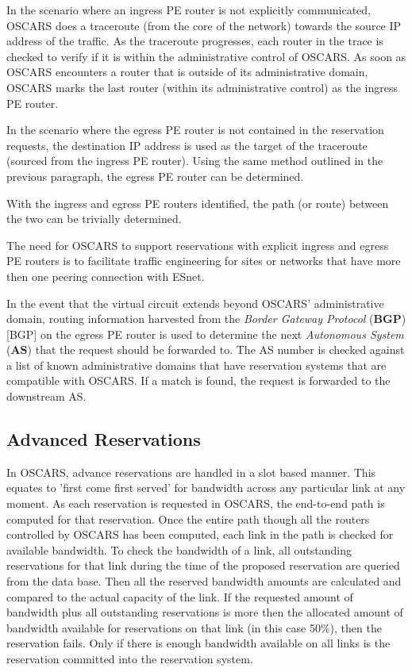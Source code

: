 \documentclass[conference]{IEEEtran}
\begin{document}
In the scenario where an ingress PE router is not explicitly communicated, 
OSCARS does a traceroute (from the core of the network) towards the source IP address of the traffic. As the traceroute
progresses, each router in the trace is checked to verify if 
it is within the administrative control of OSCARS. As soon as OSCARS encounters a router that
is outside of its administrative domain, OSCARS marks the last router (within its administrative
 control) as the ingress PE router.

In the scenario where the egress PE router is not contained in the reservation requests, 
the destination IP address is used as the target of the traceroute (sourced from the ingress PE router).
Using the same method outlined in the previous paragraph, the egress PE router can be determined.

With the ingress and egress PE routers identified, the path (or route) between the two can be trivially determined.

The need for OSCARS to support reservations with explicit ingress and egress PE routers is to
facilitate traffic engineering for sites or networks that have more then one peering connection with ESnet.

In the event that the virtual circuit extends beyond OSCARS' administrative domain,
routing information harvested from the \emph{Border Gateway Protocol} (\textbf{BGP}) [BGP] on the egress PE router is used to determine the next
\emph{Autonomous System} (\textbf{AS}) that the request should be forwarded to.   The AS number is
checked against a list of known administrative domains that have reservation systems
that are compatible with OSCARS.  If a match is found, the request is forwarded to the
downstream AS.

\subsection{Advanced Reservations }
In OSCARS, advance reservations are handled in a slot based manner. This equates
to 'first come first served' for bandwidth across any particular link at any
moment. As each reservation is requested in OSCARS, the end-to-end path is
computed for that reservation. Once the entire path though all the routers
controlled by OSCARS has been computed, each link in the path is checked for
available bandwidth. To check the bandwidth of a link, all outstanding
reservations for that link during the time of the proposed reservation are
queried from the data base. Then all the reserved bandwidth amounts are
calculated and compared to the actual capacity of the link. If the requested
amount of bandwidth plus all outstanding reservations is more then the allocated
amount of bandwidth available for reservations on that link (in this case
50\%), then the reservation fails. Only if there is enough bandwidth 
available on all links is the reservation committed into the reservation system.
\end{document}
